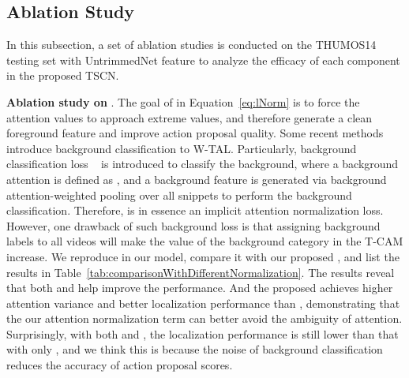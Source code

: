 \documentclass[runningheads]{llncs}
\begin{document}
\subsection{Ablation Study}
\label{subsec:ablationStudy}

In this subsection, a set of ablation studies is conducted on the THUMOS14 testing set with UntrimmedNet feature to analyze the efficacy of each component in the proposed TSCN.

\noindent\textbf{Ablation study on }. 
The goal of  in Equation~\eqref{eq:lNorm} is to force the attention values to approach extreme values, and therefore generate a clean foreground feature  and improve action proposal quality.
Some recent methods~\cite{nguyen2019weakly,lee2020background} introduce background classification to W-TAL. 
Particularly, background classification loss ~\cite{nguyen2019weakly} is introduced to classify the background, where a background attention is defined as , and a background feature is generated via background attention-weighted pooling over all snippets to perform the background classification.
Therefore,  is in essence an implicit attention normalization loss.
However, one drawback of such background loss is that assigning background labels to all videos will make the value of the background category in the T-CAM increase.
We reproduce  in our model, compare it with our proposed , and list the results in Table~\ref{tab:comparisonWithDifferentNormalization}. 
The results reveal that both  and  help improve the performance. 
And the proposed  achieves higher attention variance and better localization performance than , demonstrating that the our attention normalization term  can better avoid the ambiguity of attention.
Surprisingly, with both  and , the localization performance is still lower than that with only , and we think this is because the noise of background classification reduces the accuracy of action proposal scores.
\end{document}
